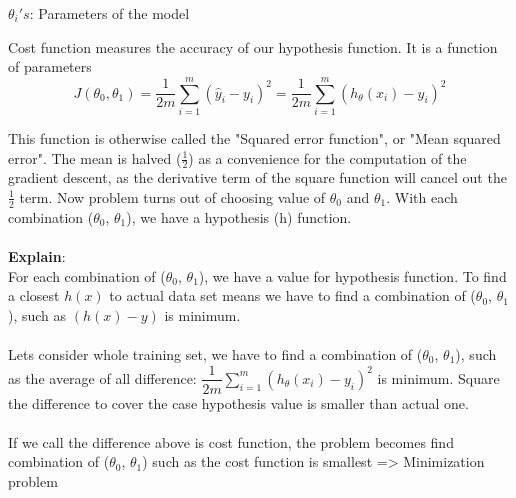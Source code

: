 \documentclass[a4paper, 10pt]{article}
\begin{document}
$\theta_{i}'s$: Parameters of the model

Cost function measures the accuracy of our hypothesis function. It is a function of parameters
\begin{equation*}
	J(\theta_0, \theta_1) = \dfrac {1}{2m} \displaystyle \sum _{i=1}^m \left ( \hat{y}_{i}- y_{i} \right)^2 = \dfrac {1}{2m} \displaystyle \sum _{i=1}^m \left (h_\theta (x_{i}) - y_{i} \right)^2
\end{equation*}

This function is otherwise called the "Squared error function", or "Mean squared error". The mean is halved ($\frac{1}{2}$) as a convenience for the computation of the gradient descent, as the derivative term of the square function will cancel out the $\frac{1}{2}$ term.
Now problem turns out of choosing value of $\theta_{0}$ and $\theta_1$. With each combination ($\theta_{0}$, $\theta_1$), we have a hypothesis (h) function.\\ \\
\textbf{Explain}:\\
	For each combination of ($\theta_{0}$, $\theta_1$), we have a value for hypothesis function. To find a closest $h(x)$ to actual data set means we have to find a combination of ($\theta_{0}$, $\theta_1$), such as $(h(x) - y)$ is minimum. \\ \\
	Lets consider whole training set, we have to find a combination of ($\theta_{0}$, $\theta_1$), such as the average of all difference: $\dfrac {1}{2m}\displaystyle \sum _{i=1}^m \left (h_\theta (x_{i}) - y_{i} \right)^2$ is minimum. Square the difference to cover the case hypothesis value is smaller than actual one. \\ \\
	
	If we call the difference above is cost function, the problem becomes find combination of ($\theta_{0}$, $\theta_1$) such as the cost function is smallest => Minimization problem
	
\end{document}
